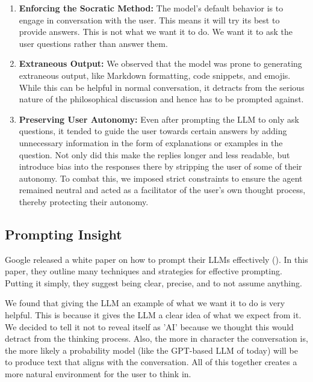\documentclass[letterpaper,11pt,leqno]{article}
\begin{document}
\begin{enumerate}[label=\textbf{\arabic*.}]
  \item \textbf{Enforcing the Socratic Method: } The model's default behavior is to engage in conversation with the user. This means it will try its best to provide answers. This is not what we want it to do. We want it to ask the user questions rather than answer them.

  \item \textbf{Extraneous Output: } We observed that the model was prone to generating extraneous output, like Markdown formatting, code snippets, and emojis. While this can be helpful in normal conversation, it detracts from the serious nature of the philosophical discussion and hence has to be prompted against.

  \item \textbf{Preserving User Autonomy: } Even after prompting the LLM to only ask questions, it tended to guide the user towards certain answers by adding unnecessary information in the form of explanations or examples in the question. Not only did this make the replies longer and less readable, but introduce bias into the responses there by stripping the user of some of their autonomy. To combat this, we imposed strict constraints to ensure the agent remained neutral and acted as a facilitator of the user's own thought process, thereby protecting their autonomy.
\end{enumerate}

\subsection{Prompting Insight}

Google released a white paper on how to prompt their LLMs effectively (\cite{PromptEngineering}). In this paper, they outline many techniques and strategies for effective prompting. Putting it simply, they suggest being clear, precise, and to not assume anything. 

We found that giving the LLM an example of what we want it to do is very helpful. This is because it gives the LLM a clear idea of what we expect from it. We decided to tell it not to reveal itself as 'AI' because we thought this would detract from the thinking process. Also, the more in character the conversation is, the more likely a probability model (like the GPT-based LLM of today) will be to produce text that aligns with the conversation. All of this together creates a more natural environment for the user to think in.
\end{document}
